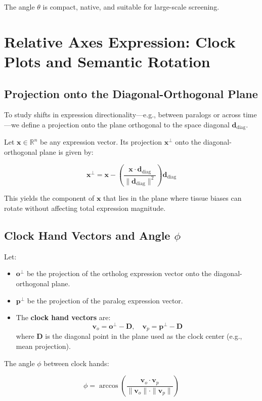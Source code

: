 \documentclass[11pt]{article}
\begin{document}
The angle $\theta$ is compact, native, and suitable for large-scale screening.

\section{Relative Axes Expression: Clock Plots and Semantic Rotation}

\subsection{Projection onto the Diagonal-Orthogonal Plane}

To study shifts in expression directionality—e.g., between paralogs or across time—we define a projection onto the plane orthogonal to the space diagonal $\mathbf{d}_{\text{diag}}$.

Let $\mathbf{x} \in \mathbb{R}^n$ be any expression vector. Its projection $\mathbf{x}^\perp$ onto the diagonal-orthogonal plane is given by:

\[
\mathbf{x}^\perp = \mathbf{x} - \left( \frac{\mathbf{x} \cdot \mathbf{d}_{\text{diag}}}{\|\mathbf{d}_{\text{diag}}\|^2} \right) \mathbf{d}_{\text{diag}}
\]

This yields the component of $\mathbf{x}$ that lies in the plane where tissue biases can rotate without affecting total expression magnitude.

\subsection{Clock Hand Vectors and Angle $\phi$}

Let:
\begin{itemize}[leftmargin=1.5em]
    \item $\mathbf{o}^\perp$ be the projection of the ortholog expression vector onto the diagonal-orthogonal plane.
    \item $\mathbf{p}^\perp$ be the projection of the paralog expression vector.
    \item The \textbf{clock hand vectors} are:
    \[
    \mathbf{v}_o = \mathbf{o}^\perp - \mathbf{D}, \quad \mathbf{v}_p = \mathbf{p}^\perp - \mathbf{D}
    \]
    where $\mathbf{D}$ is the diagonal point in the plane used as the clock center (e.g., mean projection).
\end{itemize}

The angle $\phi$ between clock hands:

\[
\phi = \arccos \left( \frac{ \mathbf{v}_o \cdot \mathbf{v}_p }{ \|\mathbf{v}_o\| \cdot \|\mathbf{v}_p\| } \right)
\]
\end{document}
